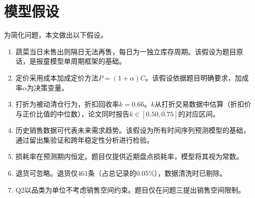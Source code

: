 
\section{模型假设}

为简化问题，本文做出以下假设。

\begin{enumerate}[label=\textbf{假设\arabic*}, itemindent=2em, leftmargin=4em]
\item 蔬菜当日未售出则隔日无法再售，每日为一独立库存周期。该假设为题目原话，是报童模型单周期框架的基础。

\item 定价采用成本加成定价方法$P=(1+\alpha)C$。该假设依据题目明确要求，加成率$\alpha$为决策变量。

\item 打折为被动清仓行为，折扣回收率$k=0.66$。$k$从打折交易数据中估算（折扣价与正价比值的中位数），论文同时报告$k\in[0.50,0.75]$的对应区间。

\item 历史销售数据可代表未来需求趋势。该假设为所有时间序列预测模型的基础，通过留出集验证和跨年稳定性分析进行检验。

\item 损耗率在预测期内恒定。题目仅提供近期盘点损耗率，模型将其视为常数。

\item 退货可忽略。退货仅461条（占总记录的0.05\%），数据清洗时已剔除。

\item Q2以品类为单位不考虑销售空间约束。题目仅在问题三提出销售空间限制。
\end{enumerate}
